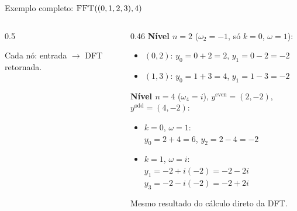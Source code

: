 \documentclass[aspectratio=169,10pt]{beamer}
\newcommand{\proc}[1]{\textnormal{\rmfamily\textsc{#1}}}
\newcommand{\yev}{y^{\mathrm{even}}}
\newcommand{\yod}{y^{\mathrm{odd}}}
\begin{document}
\begin{frame}{Exemplo completo: $\proc{FFT}((0,1,2,3), 4)$}
  \begin{columns}[c]
    \begin{column}{0.5\textwidth}
      \centering

      \vspace{4pt}
      {\scriptsize Cada nó: entrada $\to$ DFT retornada.}
    \end{column}
    \begin{column}{0.46\textwidth}
      \small
      \textbf{Nível $n=2$} ($\omega_2 = -1$, só $k=0$, $\omega=1$):
      \begin{itemize}
        \item $(0,2)$: $y_0 = 0+2 = 2$, \; $y_1 = 0-2 = -2$
        \item $(1,3)$: $y_0 = 1+3 = 4$, \; $y_1 = 1-3 = -2$
      \end{itemize}
      \textbf{Nível $n=4$} ($\omega_4 = i$), $\yev = (2,-2)$, $\yod = (4,-2)$:
      \begin{itemize}
        \item $k=0$, $\omega = 1$:\\
          $y_0 = 2 + 4 = 6$, \; $y_2 = 2 - 4 = -2$
        \item $k=1$, $\omega = i$:\\
          $y_1 = -2 + i(-2) = -2-2i$\\
          $y_3 = -2 - i(-2) = -2+2i$
      \end{itemize}
      Mesmo resultado do cálculo direto da DFT.
    \end{column}
  \end{columns}
\end{frame}
\end{document}
